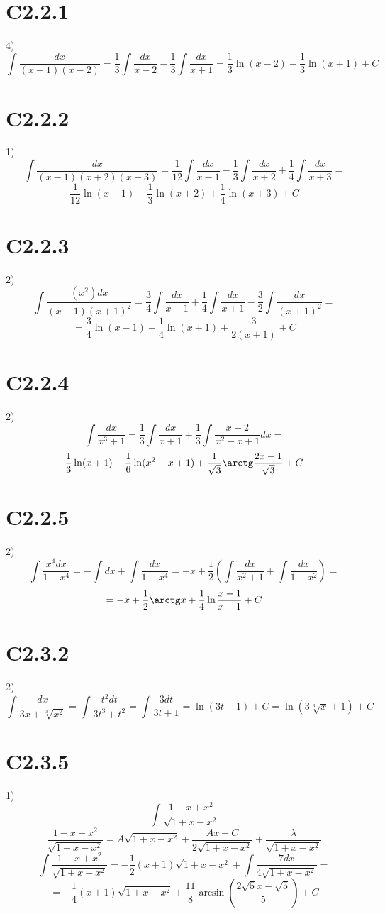 \documentclass[a4paper,12pt]{article} %
\begin{document}
\section*{C2.2.1}4)$$\int\frac{dx}{(x+1)(x-2)}=\frac{1}{3}\int\frac{dx}{x-2}-\frac{1}{3}\int\frac{dx}{x+1}=\frac{1}{3}\ln(x-2)-\frac{1}{3}\ln(x+1)+C$$
\section*{C2.2.2}1)$$\int\frac{dx}{(x-1)(x+2)(x+3)}=\frac{1}{12}\int\frac{dx}{x-1}-\frac{1}{3}\int\frac{dx}{x+2}+\frac{1}{4}\int\frac{dx}{x+3}=$$
$$\frac{1}{12}\ln(x-1)-\frac{1}{3}\ln(x+2)+\frac{1}{4}\ln(x+3)+C$$
\section*{C2.2.3}2)$$\int\frac{(x^2)dx}{(x-1)(x+1)^2}=\frac{3}{4}\int\frac{dx}{x-1}+\frac{1}{4}\int\frac{dx}{x+1}-\frac{3}{2}\int\frac{dx}{(x+1)^2}=$$
$$=\frac{3}{4}\ln(x-1)+\frac{1}{4}\ln(x+1)+\frac{3}{2(x+1)}+C$$
\section*{C2.2.4}2)$$\int\frac{dx}{x^3+1}=\frac{1}{3}\int\frac{dx}{x+1}+\frac{1}{3}\int\frac{x-2}{x^2-x+1}dx=$$
$$\frac{1}{3}\ln(x+1)-\frac{1}{6}\ln(x^2-x+1)+\frac{1}{\sqrt{3}}\arctg\frac{2x-1}{\sqrt{3}}+C$$
\section*{C2.2.5}2)$$\int\frac{x^4dx}{1-x^4}=-\int dx+\int\frac{dx}{1-x^4}=-x+\frac{1}{2}\left(\int\frac{dx}{x^2+1}+\int\frac{dx}{1-x^2}\right)=$$
$$=-x+\frac{1}{2}\arctg x+\frac{1}{4}\ln\frac{x+1}{x-1}+C$$
\section*{C2.3.2}2)$$\int\frac{dx}{3x+\sqrt[3]{x^2}}=\int\frac{t^2dt}{3t^3+t^2}=\int\frac{3dt}{3t+1}=\ln(3t+1)+C=\ln(3\sqrt[3]{x}+1)+C$$
\section*{C2.3.5}1)$$\int\frac{1-x+x^2}{\sqrt{1+x-x^2}}$$
$$\frac{1-x+x^2}{\sqrt{1+x-x^2}}=A\sqrt{1+x-x^2}+\frac{Ax+C}{2\sqrt{1+x-x^2}}+\frac{\lambda}{\sqrt{1+x-x^2}}$$
$$\int\frac{1-x+x^2}{\sqrt{1+x-x^2}}=-\frac{1}{2}(x+1){\sqrt{1+x-x^2}}+\int\frac{7dx}{4{\sqrt{1+x-x^2}}}=$$
$$=-\frac{1}{4}(x+1){\sqrt{1+x-x^2}}+\frac{11}{8}\arcsin\left(\frac{2\sqrt{5}x-\sqrt{5}}{5}\right)+C$$
\end{document}
